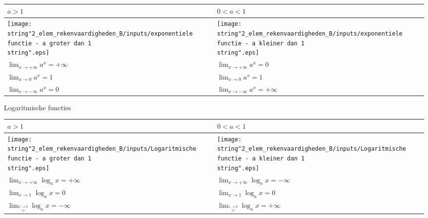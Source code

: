 \begin{table}[ht]
	\centering
	\begin{tabular}{|l||l|}
		\hline 
		$a>1$ &  $0<a<1$\\
		\hline 
		\texttt{[image: \\string"2\_elem\_rekenvaardigheden\_B/inputs/exponentiele functie - a groter dan 1\\string".eps]} &  \texttt{[image: \\string"2\_elem\_rekenvaardigheden\_B/inputs/exponentiele functie - a kleiner dan 1\\string".eps]}\\
		\hline 
		${\displaystyle \lim_{x\to+\infty}}a^{x}=+\infty$ &  ${\displaystyle \lim_{x\to+\infty}}a^{x}=0$\\
		\hline 
		${\displaystyle \lim_{x\to0}}a^{x}=1$ &  ${\displaystyle \lim_{x\to0}}a^{x}=1$\\
		\hline 
		${\displaystyle \lim_{x\to-\infty}}a^{x}=0$ &  ${\displaystyle \lim_{x\to-\infty}}a^{x}=+\infty$\\
		\hline 
	\end{tabular}
\end{table}





Logaritmische functies

\begin{table}[ht]
	\centering
	\begin{tabular}{|l||l|}
		\hline 
		$a>1$ & $0<a<1$\\
		\hline 
		\texttt{[image: \\string"2\_elem\_rekenvaardigheden\_B/inputs/Logaritmische functie - a groter dan 1\\string".eps]} & \texttt{[image: \\string"2\_elem\_rekenvaardigheden\_B/inputs/Logaritmische functie - a kleiner dan 1\\string".eps]}\\
		\hline 
		${\displaystyle \lim_{x\to+\infty}}\log_{a}x=+\infty$ & ${\displaystyle \lim_{x\to+\infty}}\log_{a}x=-\infty$\\
		\hline 
		${\displaystyle \lim_{x\to1}}\log_{a}x=0$ & ${\displaystyle \lim_{x\to1}}\log_{a}x=0$\\
		\hline 
		${\displaystyle \lim_{\overset{x\rightarrow0}{>}}}\log_{a}x=-\infty$ & ${\displaystyle \lim_{\overset{x\rightarrow0}{>}}}\log_{a}x=+\infty$\\
		\hline 
	\end{tabular}
\end{table}



